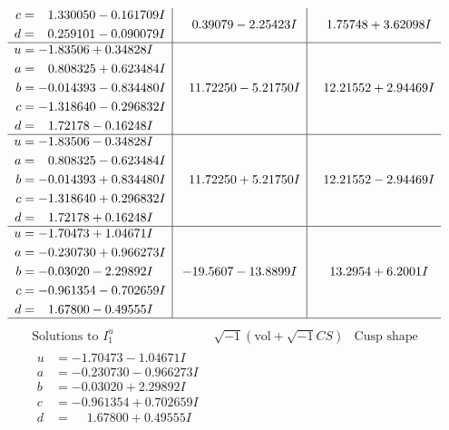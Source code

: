 \documentclass[1p]{elsarticle_modified}
\theoremstyle{definition}
\newcommand{\I}{\sqrt{-1}}
\begin{document}
$$\begin{array}{c|c|c}
\begin{aligned}
c &= \phantom{-}1.330050 - 0.161709 I \\
d &= \phantom{-}0.259101 - 0.090079 I\end{aligned}
 & \phantom{-}0.39079 - 2.25423 I & \phantom{-}1.75748 + 3.62098 I \\ \hline\begin{aligned}
u &= -1.83506 + 0.34828 I \\
a &= \phantom{-}0.808325 + 0.623484 I \\
b &= -0.014393 - 0.834480 I \\
c &= -1.318640 - 0.296832 I \\
d &= \phantom{-}1.72178 - 0.16248 I\end{aligned}
 & \phantom{-}11.72250 - 5.21750 I & \phantom{-}12.21552 + 2.94469 I \\ \hline\begin{aligned}
u &= -1.83506 - 0.34828 I \\
a &= \phantom{-}0.808325 - 0.623484 I \\
b &= -0.014393 + 0.834480 I \\
c &= -1.318640 + 0.296832 I \\
d &= \phantom{-}1.72178 + 0.16248 I\end{aligned}
 & \phantom{-}11.72250 + 5.21750 I & \phantom{-}12.21552 - 2.94469 I \\ \hline\begin{aligned}
u &= -1.70473 + 1.04671 I \\
a &= -0.230730 + 0.966273 I \\
b &= -0.03020 - 2.29892 I \\
c &= -0.961354 - 0.702659 I \\
d &= \phantom{-}1.67800 - 0.49555 I\end{aligned}
 & -19.5607 - 13.8899 I & \phantom{-}13.2954 + 6.2001 I\\
 \hline 
 \end{array}$$\newpage$$\begin{array}{c|c|c}  
\text{Solutions to }I^u_{1}& \I (\text{vol} + \sqrt{-1}CS) & \text{Cusp shape}\\
 \hline 
\begin{aligned}
u &= -1.70473 - 1.04671 I \\
a &= -0.230730 - 0.966273 I \\
b &= -0.03020 + 2.29892 I \\
c &= -0.961354 + 0.702659 I \\
d &= \phantom{-}1.67800 + 0.49555 I\end{aligned}

\end{array}$$
\end{document}
